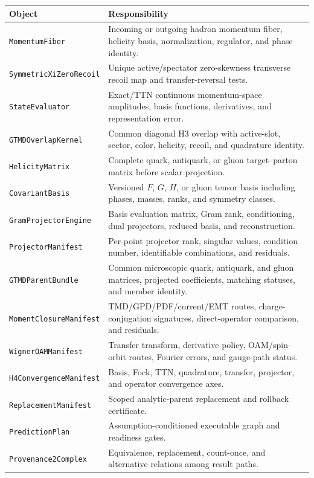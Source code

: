 \documentclass[11pt]{article}
\newcommand{\PredictionPlan}{\texttt{PredictionPlan}}
\newcommand{\MomentumFiber}{\texttt{MomentumFiber}}
\newcommand{\RecoilMap}{\texttt{SymmetricXiZeroRecoil}}
\newcommand{\MomentManifest}{\texttt{MomentClosureManifest}}
\newcommand{\ConvergenceManifest}{\texttt{H4ConvergenceManifest}}
\newcommand{\ProvComplex}{\texttt{Provenance2Complex}}
\begin{document}
\begin{longtable}{L{0.27\textwidth}L{0.65\textwidth}}
\toprule
Object & Responsibility\\
\midrule
\endhead
\MomentumFiber & Incoming or outgoing hadron momentum fiber, helicity basis,
normalization, regulator, and phase identity.\\
\RecoilMap & Unique active/spectator zero-skewness transverse recoil map and
transfer-reversal tests.\\
\texttt{StateEvaluator} & Exact/TTN continuous momentum-space amplitudes, basis
functions, derivatives, and representation error.\\
\texttt{GTMDOverlapKernel} & Common diagonal H3 overlap with active-slot, sector, color,
helicity, recoil, and quadrature identity.\\
\texttt{HelicityMatrix} & Complete quark, antiquark, or gluon target--parton matrix
before scalar projection.\\
\texttt{CovariantBasis} & Versioned \(F\), \(G\), \(H\), or gluon tensor
basis including phases, masses, ranks, and symmetry classes.\\
\texttt{GramProjectorEngine} & Basis evaluation matrix, Gram rank,
conditioning, dual projectors, reduced basis, and reconstruction.\\
\texttt{ProjectorManifest} & Per-point projector rank, singular values, condition
number, identifiable combinations, and residuals.\\
\texttt{GTMDParentBundle} & Common microscopic quark, antiquark, and gluon matrices,
projected coefficients, matching statuses, and member identity.\\
\MomentManifest & TMD/GPD/PDF/current/EMT routes, charge-conjugation
signatures, direct-operator comparison, and residuals.\\
\texttt{WignerOAMManifest} & Transfer transform, derivative policy, OAM/spin--orbit
routes, Fourier errors, and gauge-path status.\\
\ConvergenceManifest & Basis, Fock, TTN, quadrature, transfer, projector, and
operator convergence axes.\\
\texttt{ReplacementManifest} & Scoped analytic-parent replacement and rollback
certificate.\\
\PredictionPlan & Assumption-conditioned executable graph and readiness
gates.\\
\ProvComplex & Equivalence, replacement, count-once, and alternative
relations among result paths.\\
\bottomrule
\end{longtable}
\end{document}
